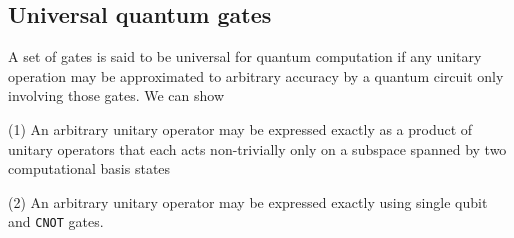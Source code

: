 \documentclass[main.tex]{subfiles}
\begin{document}
\begin{subappendices}
%
%
%
%
%
%
%
%


\begin{exercise}
	
\end{exercise}

\subsection{Universal quantum gates}

A set of gates is said to be universal for quantum computation if any unitary operation may be approximated to arbitrary accuracy by a quantum circuit only involving those gates. We can show

(1) An arbitrary unitary operator may be expressed exactly as a product of unitary operators that each acts non-trivially only on a subspace spanned by two computational basis states

(2) An arbitrary unitary operator may be expressed exactly using single qubit and \texttt{CNOT} gates.


\end{subappendices}
\end{document}

